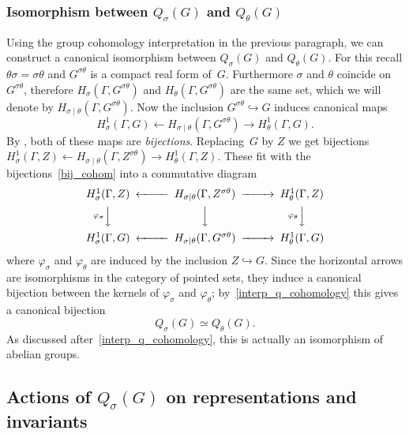 \documentclass[10pt,leqno]{article}
\begin{document}
\subsubsection{Isomorphism between $Q_{\sigma}(G)$ and $Q_{\theta}(G)$}

Using the group cohomology interpretation in the previous paragraph, we can construct a canonical  isomorphism between $Q_{\sigma}(G)$ and $Q_{\theta}(G)$.
For this recall $\theta\sigma = \sigma\theta$ and $G^{\sigma\theta}$ is a compact real form of~$G$.
Furthermore $\sigma$ and $\theta$ coincide on $G^{\sigma\theta}$,
therefore  $H_{\sigma}(\Gamma, G^{\sigma\theta})$ and  $H_{\theta}(\Gamma, G^{\sigma\theta})$ are the same set,
which we will denote by  $H_{\sigma\mid\theta}(\Gamma, G^{\sigma\theta})$.
Now the inclusion $G^{\sigma\theta} \hookrightarrow G$ induces canonical maps 
\begin{equation} \label{bij_cohom} H^{1}_{\sigma}(\Gamma, G) \longleftarrow H_{\sigma\mid\theta}(\Gamma, G^{\sigma\theta}) \longrightarrow H^{1}_{\theta}(\Gamma, G).\end{equation}
By \cite[Corollary~4.4 and Corollary 4.7]{galois}, both of these maps are \emph{bijections}.
Replacing~$G$ by $Z$ we get bijections $H^{1}_{\sigma}(\Gamma, Z) \leftarrow H_{\sigma\mid\theta}(\Gamma, Z^{\sigma\theta}) \rightarrow H^{1}_{\theta}(\Gamma, Z)$.
These fit with the bijections~\eqref{bij_cohom} into a commutative diagram
\[
\begin{CD}
H^{1}_{\sigma}(\Gamma, Z) @<<< H_{\sigma\mid\theta}(\Gamma, Z^{\sigma\theta})@>>> H^{1}_{\theta}(\Gamma, Z)
 \\
@V{\varphi_{\sigma}}VV @VVV @V{\varphi_{\theta}}VV  \\
H^{1}_{\sigma}(\Gamma, G) @<<< H_{\sigma\mid\theta}(\Gamma, G^{\sigma\theta})@>>> H^{1}_{\theta}(\Gamma, G)
\end{CD}
\]
where $\varphi_{\sigma}$ and $\varphi_{\theta}$ are induced by the inclusion $Z \hookrightarrow G$. Since the horizontal arrows are isomorphisms in the category of pointed sets, they induce a canonical bijection between the kernels of $\varphi_{\sigma}$ and $\varphi_{\theta}$; by~\eqref{interp_q_cohomology} this gives a canonical bijection 
\[ Q_{\sigma}(G) \simeq Q_{\theta}(G).\] 
As discussed after~\eqref{interp_q_cohomology}, this is actually an isomorphism of abelian groups. 




\subsection{Actions of $Q_\sigma(G)$ on representations and invariants}
\end{document}
